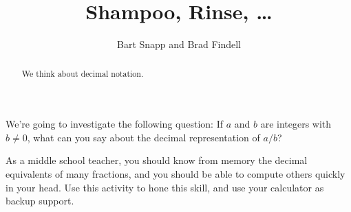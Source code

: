\documentclass[nooutcomes]{ximera}
\title{Shampoo, Rinse, \dots}
\author{Bart Snapp and Brad Findell}
\begin{document}
\begin{abstract}
  We think about decimal notation.
\end{abstract}
\maketitle

\label{A:Shampoo}

We're going to investigate the following question: If $a$ and $b$ are
integers with $b \ne 0$, what can you say about the decimal
representation of $a/b$? 

As a middle school teacher, you should know from memory the decimal equivalents of many fractions, and 
you should be able to compute others quickly in your head.  Use this activity to hone this skill, and use your calculator 
as backup support.  
\end{document}
